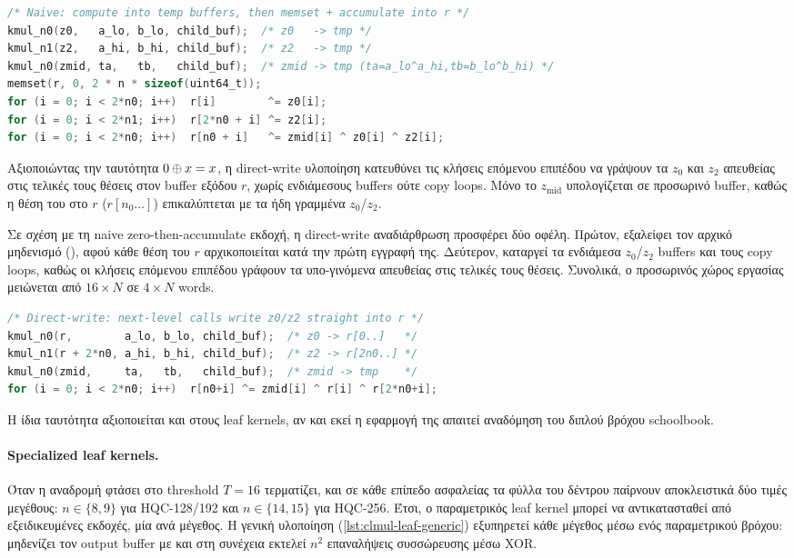 \begin{lstlisting}[language=C,caption={Naive ανασύνθεση: zero-then-accumulate σε temp buffers, μηδενισμός με \code{memset}.},label={lst:tree-recompose-naive}]
/* Naive: compute into temp buffers, then memset + accumulate into r */
kmul_n0(z0,   a_lo, b_lo, child_buf);  /* z0   -> tmp */
kmul_n1(z2,   a_hi, b_hi, child_buf);  /* z2   -> tmp */
kmul_n0(zmid, ta,   tb,   child_buf);  /* zmid -> tmp (ta=a_lo^a_hi,tb=b_lo^b_hi) */
memset(r, 0, 2 * n * sizeof(uint64_t));
for (i = 0; i < 2*n0; i++)  r[i]        ^= z0[i];
for (i = 0; i < 2*n1; i++)  r[2*n0 + i] ^= z2[i];
for (i = 0; i < 2*n0; i++)  r[n0 + i]   ^= zmid[i] ^ z0[i] ^ z2[i];
\end{lstlisting}

Αξιοποιώντας την ταυτότητα $0 \oplus x = x$, η direct-write υλοποίηση
κατευθύνει τις κλήσεις επόμενου επιπέδου να γράψουν τα $z_0$ και $z_2$
απευθείας στις τελικές τους θέσεις στον buffer εξόδου $r$, χωρίς
ενδιάμεσους buffers ούτε copy loops. Μόνο το $z_\text{mid}$ υπολογίζεται
σε προσωρινό buffer, καθώς η θέση του στο $r$ ($r[n_0 \ldots]$)
επικαλύπτεται με τα ήδη γραμμένα $z_0$/$z_2$.

Σε σχέση με τη naive zero-then-accumulate εκδοχή, η direct-write
αναδιάρθρωση προσφέρει δύο οφέλη. Πρώτον, εξαλείφει τον αρχικό μηδενισμό
(), αφού κάθε θέση του $r$ αρχικοποιείται κατά την πρώτη
εγγραφή της. Δεύτερον, καταργεί τα ενδιάμεσα $z_0$/$z_2$ buffers και τους
copy loops, καθώς οι κλήσεις επόμενου επιπέδου γράφουν τα υπο-γινόμενα
απευθείας στις τελικές τους θέσεις. Συνολικά, ο προσωρινός χώρος εργασίας
μειώνεται από $16{\times}N$ σε $4{\times}N$ words.

\begin{lstlisting}[language=C,caption={Direct-write ανασύνθεση: οι κλήσεις επόμενου επιπέδου γράφουν απευθείας στο $r$.},label={lst:tree-recompose-direct}]
/* Direct-write: next-level calls write z0/z2 straight into r */
kmul_n0(r,        a_lo, b_lo, child_buf);  /* z0 -> r[0..]   */
kmul_n1(r + 2*n0, a_hi, b_hi, child_buf);  /* z2 -> r[2n0..] */
kmul_n0(zmid,     ta,   tb,   child_buf);  /* zmid -> tmp    */
for (i = 0; i < 2*n0; i++)  r[n0+i] ^= zmid[i] ^ r[i] ^ r[2*n0+i];
\end{lstlisting}

Η ίδια ταυτότητα αξιοποιείται και στους leaf kernels, αν και εκεί η εφαρμογή
της απαιτεί αναδόμηση του διπλού βρόχου schoolbook.

\paragraph{Specialized leaf kernels.}
Όταν η αναδρομή φτάσει στο threshold $T=16$ τερματίζει, και σε κάθε
επίπεδο ασφαλείας τα φύλλα του δέντρου παίρνουν αποκλειστικά δύο τιμές
μεγέθους: $n \in \{8, 9\}$ για HQC-128/192 και $n \in \{14, 15\}$ για
HQC-256. Έτσι, ο παραμετρικός leaf kernel μπορεί να αντικατασταθεί από εξειδικευμένες εκδοχές, μία ανά
μέγεθος. Η γενική υλοποίηση (\cref{lst:clmul-leaf-generic}) εξυπηρετεί 
κάθε μέγεθος μέσω ενός παραμετρικού βρόχου: μηδενίζει τον output buffer 
με  και στη συνέχεια εκτελεί $n^2$ επαναλήψεις συσσώρευσης μέσω XOR.

